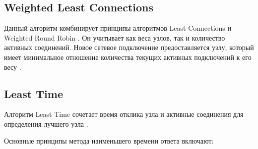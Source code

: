 

\subsection{Weighted Least Connections}

Данный алгоритм комбинирует принципы алгоритмов Least Connections и Weighted Round Robin \cite{weightedroundrobin}. %
Он учитывает как веса узлов, так и количество активных соединений. 
Новое сетевое подключение предоставляется узлу, который имеет минимальное отношение количества текущих активных подключений к его весу \cite{mainsource}.


\subsection{Least Time}
Алгоритм Least Time сочетает время отклика узла и активные соединения для определения лучшего узла \cite{balance}. 

Основные принципы метода наименьшего времени ответа включают:


